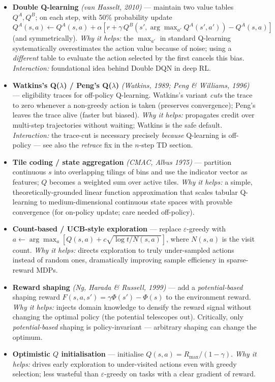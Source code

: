 \documentclass[11pt]{article}
\begin{document}
\begin{itemize}
\item
  \label{trick-2-5-1}\textbf{Double Q-learning}
  \emph{(van Hasselt, 2010)} --- maintain two value tables \(Q^A, Q^B\);
  on each step, with 50\% probability update
  \(Q^A(s,a)\leftarrow Q^A(s,a) + \alpha[r + \gamma\,Q^B(s', \arg\max_{a'} Q^A(s',a')) - Q^A(s,a)]\)
  (and symmetrically). \emph{Why it helps:} the \(\max_{a'}\) in
  standard Q-learning systematically overestimates the action value
  because of noise; using a \emph{different} table to evaluate the
  action selected by the first cancels this bias. \emph{Interaction:}
  foundational idea behind Double DQN in deep RL.
\item
  \label{trick-2-5-2}\textbf{Watkins's Q(\(\lambda\)) /
  Peng's Q(\(\lambda\))} \emph{(Watkins, 1989; Peng \& Williams, 1996)}
  --- eligibility traces for off-policy Q-learning. Watkins's variant
  \emph{cuts} the trace to zero whenever a non-greedy action is taken
  (preserves convergence); Peng's leaves the trace alive (faster but
  biased). \emph{Why it helps:} propagates credit over multi-step
  trajectories without waiting; Watkins is the safe default.
  \emph{Interaction:} the trace-cut is necessary precisely
  \emph{because} Q-learning is off-policy --- see also the
  \emph{retrace} fix in the \(n\)-step TD section.
\item
  \label{trick-2-5-3}\textbf{Tile coding / state
  aggregation} \emph{(CMAC, Albus 1975)} --- partition continuous \(s\)
  into overlapping tilings of bins and use the indicator vector as
  features; \(Q\) becomes a weighted sum over active tiles. \emph{Why it
  helps:} a simple, theoretically-grounded linear function approximation
  that scales tabular Q-learning to medium-dimensional continuous state
  spaces with provable convergence (for on-policy update; care needed
  off-policy).
\item
  \label{trick-2-5-4}\textbf{Count-based / UCB-style
  exploration} --- replace \(\varepsilon\)-greedy with
  \(a\leftarrow\arg\max_a [Q(s,a) + c\sqrt{\log t / N(s,a)}]\), where
  \(N(s,a)\) is the visit count. \emph{Why it helps:} directs
  exploration to truly under-sampled actions instead of random ones,
  dramatically improving sample efficiency in sparse-reward MDPs.
\item
  \label{trick-2-5-5}\textbf{Reward shaping} \emph{(Ng,
  Harada \& Russell, 1999)} --- add a \emph{potential-based} shaping
  reward \(F(s,a,s') = \gamma\Phi(s')-\Phi(s)\) to the environment
  reward. \emph{Why it helps:} injects domain knowledge to densify the
  reward signal without changing the optimal policy (the potential
  telescopes out). Critically, only \emph{potential-based} shaping is
  policy-invariant --- arbitrary shaping can change the optimum.
\item
  \label{trick-2-5-6}\textbf{Optimistic \(Q\)
  initialisation} --- initialise \(Q(s,a) = R_\text{max}/(1-\gamma)\).
  \emph{Why it helps:} drives early exploration to under-visited actions
  even with greedy selection; less wasteful than \(\varepsilon\)-greedy
  on tasks with a clear gradient of reward.
\end{itemize}
\end{document}
